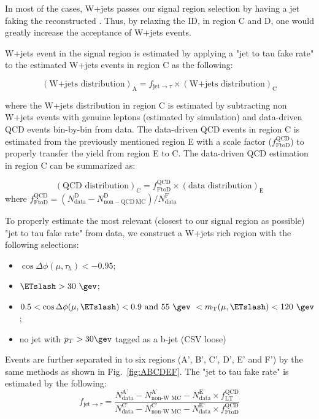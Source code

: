 In most of the cases, W+jets passes our signal region selection by having a jet 
faking the reconstructed \tauh. Thus, by relaxing the \tauh ID, in region C and D, 
one would greatly increase the acceptance of W+jets events.

W+jets event in the signal region is estimated by applying a "jet to tau fake rate" 
to the estimated W+jets events in region C as the following:

\begin{equation}
(\text{W+jets distribution})_{\text{A}} = f_{\text{jet}\rightarrow\tau} \times (\text{W+jets distribution})_{\text{C}} 
\end{equation}

where the W+jets distribution in region C is estimated by subtracting 
non W+jets events with genuine leptons (estimated by simulation) and 
data-driven QCD events bin-by-bin from data. The data-driven QCD events 
in region C is estimated from the previously mentioned region E with a 
scale factor ($f^{\text{QCD}}_{\text{FtoD}}$) to properly transfer the 
yield from region E to C. The data-driven QCD estimation in region C 
can be summarized as: 

\begin{equation}
(\text{QCD distribution})_{\text{C}} = f^{\text{QCD}}_{\text{FtoD}} \times (\text{data distribution})_{\text{E}} 
\end{equation}
where $f^{\text{QCD}}_{\text{FtoD}} = \left(N_\mathrm{data}^\mathrm{D} - N_\mathrm{non-QCD~MC}^\mathrm{D}\right)/ N_\mathrm{data}^\mathrm{F}$

To properly estimate the most relevant (closest to our signal region as possible) 
"jet to tau fake rate" from data, we construct a W+jets rich region with the 
following selections:
\begin{itemize}
  \item $\cos{\Delta \phi (\mu,\tau_{h})}<-0.95$;
  \item $\ETslash>30~\gev$;
  \item $0.5 < \cos{\Delta \phi (\mu,\ETslash)} < 0.9~\text{and}~55~\gev~< m_{\text{T}}(\mu,\ETslash) < 120~\gev$;
  \item no jet with $p_T>30\gev$ tagged as a b-jet (CSV loose)
\end{itemize}
Events are further separated in to six regions (A', B', C', D', E' and F') by 
the same methods as shown in Fig.~\ref{fig:ABCDEF}. The "jet to tau fake rate" 
is estimated by the following:
\begin{equation} \label{eq:fakeRate}
f_{\text{jet}\rightarrow\tau} = \frac{N^{\text{A'}}_{\text{data}} - N^{\text{A'}}_{\text{non-W MC}} - N^{\text{E'}}_{\text{data}}\times f^{\text{QCD}}_{\text{LT}}}
{N^{\text{C'}}_{\text{data}} - N^{\text{C'}}_{\text{non-W MC}} - N^{\text{E'}}_{\text{data}}\times f^{\text{QCD}}_{\text{FtoD}}}
\end{equation}

